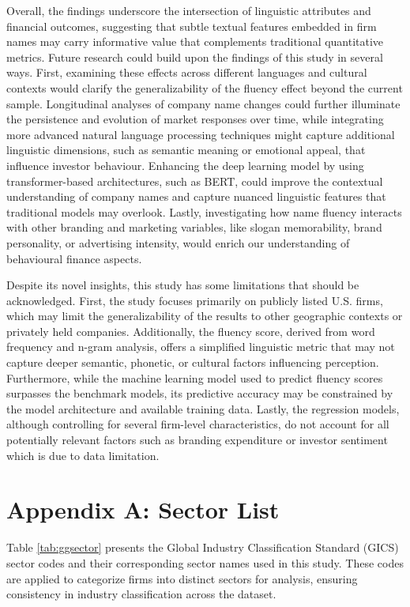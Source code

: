 \documentclass[a4paper,11pt]{report}
\begin{document}
Overall, the findings underscore the intersection of linguistic attributes and financial outcomes, suggesting that subtle textual features embedded in firm names may carry informative value that complements traditional quantitative metrics. Future research could build upon the findings of this study in several ways. First,  examining these effects across different languages and cultural contexts would clarify the generalizability of the fluency effect beyond the current sample. Longitudinal analyses of company name changes could further illuminate the persistence and evolution of market responses over time, while integrating more advanced natural language processing techniques might capture additional linguistic dimensions, such as semantic meaning or emotional appeal, that influence investor behaviour. Enhancing the deep learning model by using transformer-based architectures, such as BERT, could improve the contextual understanding of company names and capture nuanced linguistic features that traditional models may overlook. Lastly, investigating how name fluency interacts with other branding and marketing variables, like slogan memorability, brand personality, or advertising intensity, would enrich our understanding of behavioural finance aspects. 

Despite its novel insights, this study has some limitations that should be acknowledged. First, the study focuses primarily on publicly listed U.S. firms, which may limit the generalizability of the results to other geographic contexts or privately held companies. Additionally, the fluency score, derived from word frequency and n-gram analysis, offers a simplified linguistic metric that may not capture deeper semantic, phonetic, or cultural factors influencing perception. Furthermore, while the machine learning model used to predict fluency scores surpasses the benchmark models, its predictive accuracy may be constrained by the model architecture and available training data. Lastly, the regression models, although controlling for several firm-level characteristics, do not account for all potentially relevant factors such as branding expenditure or investor sentiment which is due to data limitation.

 


\newpage
\section*{Appendix A: Sector List}\label{AppendixA}
Table \ref{tab:ggsector} presents the Global Industry Classification Standard (GICS) sector codes and their corresponding sector names used in this study. These codes are applied to categorize firms into distinct sectors for analysis, ensuring consistency in industry classification across the dataset.
\end{document}

